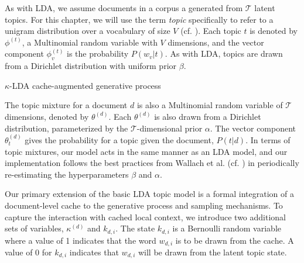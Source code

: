 As with LDA, we assume documents in a corpus a generated from $\mathcal{T}$ latent topics.  For this chapter, we will use the term \textit{topic} specifically to refer to a unigram distribution over a vocabulary of size $V$ (cf. \cite{wallach2006}).  Each topic $t$ is denoted by $\phi^{(t)}$, a Multinomial random variable with $V$ dimensions, and the vector component $\phi^{(t)}_v$ is the probability $P(w_v|t)$.  As with LDA, topics are drawn from a Dirichlet distribution with uniform prior $\beta$.

\begin{algorithm}[t]
\caption{$\kappa$-LDA cache-augmented generative process\label{alg5:kLDA}}
\begin{algorithmic}[1]
\ENDFOR                                                

        \ELSE
        \ENDIF
    \ENDFOR
\ENDFOR
\end{algorithmic}
\end{algorithm}

The topic mixture for a document $d$ is also a Multinomial random variable of $\mathcal{T}$ dimensions, denoted by $\theta^{(d)}$.  Each $\theta^{(d)}$ is also drawn from a Dirichlet distribution, parameterized by the $\mathcal{T}$-dimensional prior $\alpha$.   The vector component $\theta^{(d)}_t$ gives the probability for a topic given the document, $P(t|d)$.  In terms of topic mixtures, our model acts in the same manner as an LDA model, and our implementation follows the best practices from Wallach et al. (cf. \cite{wallach2006}) in periodically re-estimating the hyperparameters $\beta$ and $\alpha$.

Our primary extension of the basic LDA topic model is a formal integration of a document-level cache to the generative process and sampling mechanisms.   To capture the interaction with cached local context, we introduce two additional sets of variables, $\kappa^{(d)}$ and $k_{d,i}$. The state $k_{d,i}$ is a Bernoulli random variable where a value of 1 indicates that the word $w_{d,i}$ is to be drawn from the cache.  A value of 0 for $k_{d,i}$ indicates that $w_{d,i}$ will be drawn from the latent topic state.  

